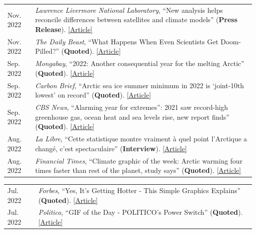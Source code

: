 \documentclass[margin,line,palatino,courier,10pt]{res}
\begin{document}
\begin{resume}
\begin{tabular}{@{}p{0.9in}p{4in}}
Nov. 2022 & \textit{Lawrence Livermore National Laboratory}, ``New analysis helps reconcile differences between satellites and climate models'' (\textbf{Press Release}). \href{https://www.llnl.gov/news/new-analysis-helps-reconcile-differences-between-satellites-climate-models}{[Article]}\\
Nov. 2022 & \textit{The Daily Beast}, ``What Happens When Even Scientists Get Doom-Pilled?'' (\textbf{Quoted}). \href{https://www.thedailybeast.com/how-climate-change-doomerism-is-even-taking-over-scientists}{[Article]}\\
Sep. 2022 & \textit{Mongabay}, ``2022: Another consequential year for the melting Arctic'' (\textbf{Quoted}). \href{https://news.mongabay.com/2022/09/2022-another-consequential-year-for-the-melting-arctic/}{[Article]}\\
Sep. 2022 & \textit{Carbon Brief}, ``Arctic sea ice summer minimum in 2022 is `joint-10th lowest' on record'' (\textbf{Quoted}). \href{https://www.carbonbrief.org/arctic-sea-ice-summer-minimum-in-2022-is-joint-10th-lowest-on-record/}{[Article]}\\
Sep. 2022 & \textit{CBS News}, ``Alarming year for extremes'': 2021 saw record-high greenhouse gas, ocean heat and sea levels rise, new report finds'' (\textbf{Quoted}). \href{https://www.cbsnews.com/news/2021-record-high-greenhouse-gases-ocean-heat-and-sea-level-rise-extreme-heat/}{[Article]}\\
Aug. 2022 & \textit{La Libre}, ``Cette statistique montre vraiment \`{a} quel point l'Arctique a chang\'{e}, c'est spectaculaire'' (\textbf{Interview}). \href{https://www.lalibre.be/planete/environnement/2022/08/17/cette-statistique-montre-vraiment-a-quel-point-larctique-a-change-cest-spectaculaire-FGU5ABQZB5F6XINIL5ZBBB3CXM/}{[Article]}\\
Aug. 2022 & \textit{Financial Times}, ``Climate graphic of the week: Arctic warming four times faster than rest of the planet, study says'' (\textbf{Quoted}). \href{https://www.ft.com/content/9bb32c6f-b3dc-46bd-944e-9e583407b866}{[Article]}\\
\end{tabular}
\begin{tabular}{@{}p{0.9in}p{4in}}
Jul. 2022 & \textit{Forbes}, ``Yes, It’s Getting Hotter - This Simple Graphics Explains'' (\textbf{Quoted}). \href{https://www.forbes.com/sites/marshallshepherd/2022/07/19/yes-its-getting-hotterthis-simple-graphics-explains/}{[Article]}\\
Jul. 2022 & \textit{Politico}, ``GIF of the Day - POLITICO's Power Switch'' (\textbf{Quoted}). \href{https://www.politico.com/newsletters/power-switch/2022/07/15/time-for-bidens-beast-mode-00046061}{[Article]}\\

\end{tabular}
\end{resume}
\end{document}
